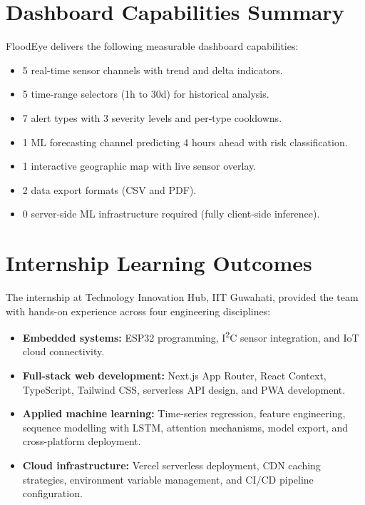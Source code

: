 \section{Dashboard Capabilities Summary}

FloodEye delivers the following measurable dashboard capabilities:
\begin{itemize}[leftmargin=1.5em]
  \item 5 real-time sensor channels with trend and delta indicators.
  \item 5 time-range selectors (1h to 30d) for historical analysis.
  \item 7 alert types with 3 severity levels and per-type cooldowns.
  \item 1 ML forecasting channel predicting 4 hours ahead with risk classification.
  \item 1 interactive geographic map with live sensor overlay.
  \item 2 data export formats (CSV and PDF).
  \item 0 server-side ML infrastructure required (fully client-side inference).
\end{itemize}

\section{Internship Learning Outcomes}

The internship at Technology Innovation Hub, IIT Guwahati, provided the team with hands-on experience across four engineering disciplines:

\begin{itemize}[leftmargin=1.5em]
  \item \textbf{Embedded systems:} ESP32 programming, I\textsuperscript{2}C sensor integration, and IoT cloud connectivity.
  \item \textbf{Full-stack web development:} Next.js App Router, React Context, TypeScript, Tailwind CSS, serverless API design, and PWA development.
  \item \textbf{Applied machine learning:} Time-series regression, feature engineering, sequence modelling with LSTM, attention mechanisms, model export, and cross-platform deployment.
  \item \textbf{Cloud infrastructure:} Vercel serverless deployment, CDN caching strategies, environment variable management, and CI/CD pipeline configuration.
\end{itemize}

